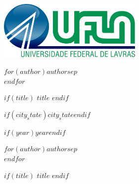 \documentclass[12pt, a4paper]{article}
\begin{document}
\begin{titlepage}
    \centering

    \includegraphics[width=7cm]{ufla_logo_colorido.png}

    \vspace{1cm}

    \fontsize{14pt}{\baselineskip}\selectfont
    \uppercase{\textbf{$for(author)$$author$$sep$\\$endfor$}}

    \vspace{5cm}

    $if(title)$
        \fontsize{16pt}{\baselineskip}\selectfont
        \uppercase{\textbf{$title$}}
    $endif$
    \normalsize

    \vfill

    \fontsize{14pt}{\baselineskip}\selectfont
    \uppercase{\textbf{$if(city_state)$$city_state$$endif$}}\par
    \textbf{$if(year)$$year$$endif$}
    \normalsize
\end{titlepage}

\thispagestyle{empty}
\centering

\fontsize{14pt}{\baselineskip}\selectfont
\uppercase{\textbf{$for(author)$$author$$sep$\\$endfor$}}

\vspace{5cm}

$if(title)$
    \fontsize{16pt}{\baselineskip}\selectfont
    \uppercase{\textbf{$title$}}
$endif$
\normalsize

\begin{flushright}
    \begin{minipage}[t]{8.5cm}
    \end{minipage}
\end{flushright}
\end{document}
